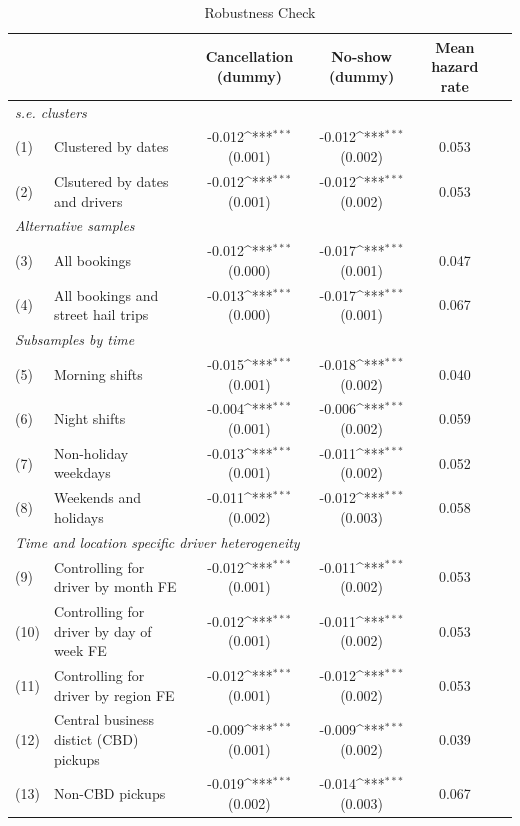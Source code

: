 \documentclass[reviewmode,AEJ]{AEA}
\begin{document}
\begin{table}[]
    \centering
    \footnotesize
    \caption{Robustness Check}
    \def\sym#1{\ifmmode^{#1}\else\(^{#1}\)\fi}
    \begin{tabularx}{\textwidth}{ll@{\extracolsep{\fill}}*{4}{c}}
    	\toprule
    	\toprule
    	&      & Cancellation (dummy) & No-show (dummy) & Mean hazard rate \\
    	\midrule
    	\multicolumn{5}{l}{\textit{s.e. clusters}} \\
    	(1)  & Clustered by dates & -0.012\sym{***} (0.001) & -0.012\sym{***} (0.002) & 0.053 \\
    	(2)  & Clsutered by dates and drivers & -0.012\sym{***} (0.001) & -0.012\sym{***} (0.002) & 0.053 \\
    	\midrule
    	\multicolumn{5}{l}{\textit{Alternative samples}} \\
    	(3)  & All bookings & -0.012\sym{***} (0.000) & -0.017\sym{***} (0.001) & 0.047 \\
    	(4)  & All bookings and street hail trips & -0.013\sym{***} (0.000) & -0.017\sym{***} (0.001) & 0.067 \\
    	\midrule
    	\multicolumn{5}{l}{\textit{Subsamples by time}} \\
    	(5)  & Morning shifts & -0.015\sym{***} (0.001) & -0.018\sym{***} (0.002) & 0.040 \\
    	(6)  & Night shifts & -0.004\sym{***} (0.001) & -0.006\sym{***} (0.002) & 0.059 \\
    	(7)  & Non-holiday weekdays & -0.013\sym{***} (0.001) & -0.011\sym{***} (0.002) & 0.052 \\
    	(8)  & Weekends and holidays & -0.011\sym{***} (0.002) & -0.012\sym{***} (0.003) & 0.058 \\
    	\midrule
    	\multicolumn{5}{l}{\textit{Time and location specific driver heterogeneity }} \\
    	(9)  & Controlling for driver by month FE & -0.012\sym{***} (0.001) & -0.011\sym{***} (0.002) & 0.053 \\
    	(10) & Controlling for driver by day of week FE & -0.012\sym{***} (0.001) & -0.011\sym{***} (0.002) & 0.053 \\
    	(11) & Controlling for driver by region FE & -0.012\sym{***} (0.001) & -0.012\sym{***} (0.002) & 0.053 \\
    	(12) & Central business distict (CBD) pickups & -0.009\sym{***} (0.001) & -0.009\sym{***} (0.002) & 0.039 \\
    	(13) & Non-CBD pickups & -0.019\sym{***} (0.002) & -0.014\sym{***} (0.003) & 0.067 \\

\end{tabularx}
\end{table}
\end{document}
